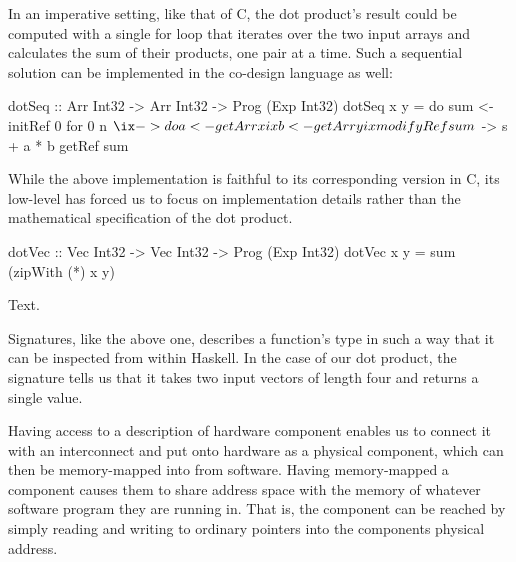 \documentclass[../main.tex]{subfiles}
\begin{document}
In an imperative setting, like that of C, the dot product's result could be computed with a single for loop that iterates over the two input arrays and calculates the sum of their products, one pair at a time. Such a sequential solution can be implemented in the co-design language as well:

\begin{code}
dotSeq :: Arr Int32 -> Arr Int32 -> Prog (Exp Int32)
dotSeq x y = do
  sum <- initRef 0
  for 0 n $ \ix -> do
    a <- getArr x ix
    b <- getArr y ix
    modifyRef sum $ \s -> s + a * b
  getRef sum
\end{code}

While the above implementation is faithful to its corresponding version in C, its low-level has forced us to focus on implementation details rather than the mathematical specification of the dot product. 

\begin{code}
dotVec :: Vec Int32 -> Vec Int32 -> Prog (Exp Int32)
dotVec x y = sum (zipWith (*) x y)
\end{code}

Text.



\noindent Signatures, like the above one, describes a function's type in such a way that it can be inspected from within Haskell. In the case of our dot product, the signature tells us that it takes two input vectors of length four and returns a single value.

Having access to a description of hardware component enables us to connect it with an interconnect and put onto hardware as a physical component, which can then be memory-mapped into from software. Having memory-mapped a component causes them to share address space with the memory of whatever software program they are running in. That is, the component can be reached by simply reading and writing to ordinary pointers into the components physical address.
\end{document}
